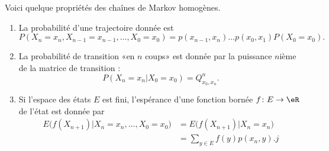 \begin{proposition}
    Voici quelque propriétés des chaînes de Markov homogènes.
    \begin{enumerate}
        \item
            La probabilité d'une trajectoire donnée est
            \begin{equation}
                P(X_n=x_n,X_{n-1}=x_{n-1},\ldots,X_0=x_0)=p(x_{n-1},x_n)\dots p(x_0,x_1)P(X_0=x_0).
            \end{equation}
        \item
            La probabilité de transition «en \( n\) coups» est donnée par la puissance \( n\)ième de la matrice de transition :
            \begin{equation}
                P(X_n=x_n|X_0=x_0)=Q^n_{x_0,x_n}.
            \end{equation}
        \item
            Si l'espace des états \( E\) est fini, l'espérance d'une fonction bornée \( f\colon E\to \eR\) de l'état est donnée par
            \begin{subequations}
                \begin{align}
                    E\big( f(X_{n+1})|X_n=x_n,\ldots,X_0=x_0 \big)&=E\big( f(X_{n+1})|X_n=x_n \big)\\
                    &=\sum_{y\in E}f(y)p(x_n,y).j
                \end{align}
            \end{subequations}
    \end{enumerate}
\end{proposition}

